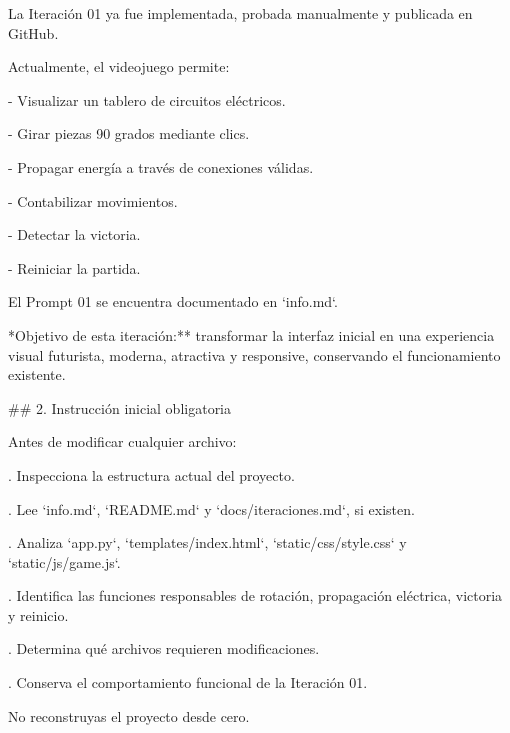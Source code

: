 \par\smallskip
\noindent La Iteración 01 ya fue implementada, probada manualmente y publicada en GitHub.\par
\par\smallskip
\noindent Actualmente, el videojuego permite:\par
\par\smallskip
\noindent - Visualizar un tablero de circuitos eléctricos.\par
\noindent - Girar piezas 90 grados mediante clics.\par
\noindent - Propagar energía a través de conexiones válidas.\par
\noindent - Contabilizar movimientos.\par
\noindent - Detectar la victoria.\par
\noindent - Reiniciar la partida.\par
\par\smallskip
\noindent El Prompt 01 se encuentra documentado en `info.md`.\par
\par\smallskip
\noindent **Objetivo de esta iteración:** transformar la interfaz inicial en una experiencia visual futurista, moderna, atractiva y responsive, conservando el funcionamiento existente.\par
\par\smallskip
\noindent \#\# 2. Instrucción inicial obligatoria\par
\par\smallskip
\noindent Antes de modificar cualquier archivo:\par
\par\smallskip
{}. Inspecciona la estructura actual del proyecto.\par
{}. Lee `info.md`, `README.md` y `docs/iteraciones.md`, si existen.\par
{}. Analiza `app.py`, `templates/index.html`, `static/css/style.css` y `static/js/game.js`.\par
{}. Identifica las funciones responsables de rotación, propagación eléctrica, victoria y reinicio.\par
{}. Determina qué archivos requieren modificaciones.\par
{}. Conserva el comportamiento funcional de la Iteración 01.\par
\par\smallskip
\noindent No reconstruyas el proyecto desde cero.\par
